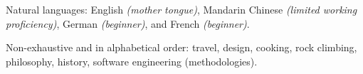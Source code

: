 \documentclass[10pt,a4paper]{article}
\begin{document}
\vspace{0.5em}
\inlineheadsection
  {Natural languages:}
  {English \emph{(mother tongue)}, Mandarin Chinese \emph{(limited working proficiency)}, German \emph{(beginner)}, and French \emph{(beginner)}.}


\spacedhrule{1.6em}{-0.4em}


\inlineheadsection
  {Non-exhaustive and in alphabetical order:}
  {travel, design, cooking, rock climbing, philosophy, history, software engineering (methodologies).}
\end{document}
